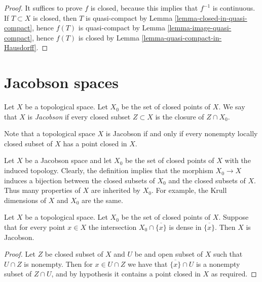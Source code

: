 \begin{proof}
It suffices to prove $f$ is closed, because this implies that
$f^{-1}$ is continuous. If $T \subset X$ is closed, then $T$
is quasi-compact by Lemma \ref{lemma-closed-in-quasi-compact},
hence $f(T)$ is quasi-compact by Lemma \ref{lemma-image-quasi-compact},
hence $f(T)$ is closed by Lemma \ref{lemma-quasi-compact-in-Hausdorff}.
\end{proof}













\section{Jacobson spaces}
\label{section-space-jacobson}

\begin{definition}
\label{definition-space-jacobson}
Let $X$ be a topological space.
Let $X_0$ be the set of closed points of $X$.
We say that $X$ is {\it Jacobson} if every
closed subset $Z \subset X$ is the closure
of $Z \cap X_0$.
\end{definition}

\noindent
Note that a topological space $X$ is Jacobson if and only if
every nonempty locally closed subset of $X$
has a point closed in $X$.

\medskip\noindent
Let $X$ be a Jacobson space and let $X_0$ be the set
of closed points of $X$ with the induced topology.
Clearly, the definition implies that the morphism
$X_0 \to X$ induces a bijection between the closed
subsets of $X_0$ and the closed subsets of $X$.
Thus many properties of $X$ are inherited by $X_0$.
For example, the Krull dimensions of $X$ and $X_0$
are the same.

\begin{lemma}
\label{lemma-jacobson-check-irreducible-closed}
Let $X$ be a topological space. Let $X_0$ be the set
of closed points of $X$.
Suppose that for every point $x\in X$
the intersection $X_0 \cap \overline{\{x\}}$ is dense in $\overline{\{x\}}$.
Then $X$ is Jacobson.
\end{lemma}

\begin{proof}
Let $Z$ be closed subset of $X$
and $U$ be and open subset of $X$
such that $U\cap Z$ is nonempty.
Then for $x\in U\cap Z$ we have that $\overline{\{x\}}\cap U$ is a nonempty
subset of $Z\cap U$,
and by hypothesis it contains a point closed in $X$ as required.
\end{proof}

